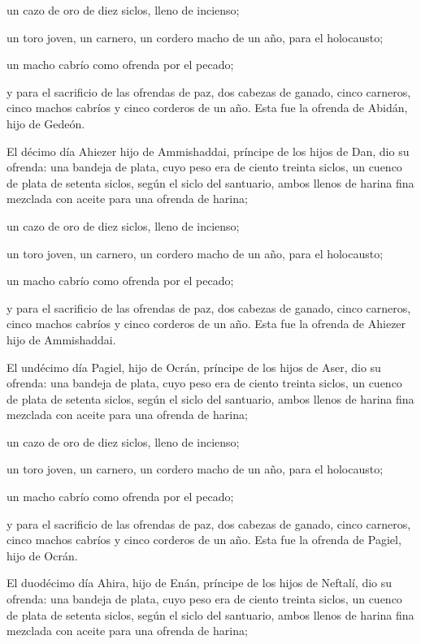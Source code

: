  un cazo de oro de diez siclos, lleno de incienso;

 un toro joven, un carnero, un cordero macho de un año,
para el holocausto;

 un macho cabrío como ofrenda por el pecado;

 y para el sacrificio de las ofrendas de paz, dos cabezas
de ganado, cinco carneros, cinco machos cabríos y cinco corderos de un
año. Esta fue la ofrenda de Abidán, hijo de Gedeón.

 El décimo día Ahiezer hijo de Ammishaddai, príncipe de
los hijos de Dan,  dio su ofrenda: una bandeja de plata,
cuyo peso era de ciento treinta siclos, un cuenco de plata de setenta
siclos, según el siclo del santuario, ambos llenos de harina fina
mezclada con aceite para una ofrenda de harina;

 un cazo de oro de diez siclos, lleno de incienso;

 un toro joven, un carnero, un cordero macho de un año,
para el holocausto;

 un macho cabrío como ofrenda por el pecado;

 y para el sacrificio de las ofrendas de paz, dos cabezas
de ganado, cinco carneros, cinco machos cabríos y cinco corderos de un
año. Esta fue la ofrenda de Ahiezer hijo de Ammishaddai.

 El undécimo día Pagiel, hijo de Ocrán, príncipe de los
hijos de Aser,  dio su ofrenda: una bandeja de plata,
cuyo peso era de ciento treinta siclos, un cuenco de plata de setenta
siclos, según el siclo del santuario, ambos llenos de harina fina
mezclada con aceite para una ofrenda de harina;

 un cazo de oro de diez siclos, lleno de incienso;

 un toro joven, un carnero, un cordero macho de un año,
para el holocausto;

 un macho cabrío como ofrenda por el pecado;

 y para el sacrificio de las ofrendas de paz, dos cabezas
de ganado, cinco carneros, cinco machos cabríos y cinco corderos de un
año. Esta fue la ofrenda de Pagiel, hijo de Ocrán.

 El duodécimo día Ahira, hijo de Enán, príncipe de los
hijos de Neftalí,  dio su ofrenda: una bandeja de plata,
cuyo peso era de ciento treinta siclos, un cuenco de plata de setenta
siclos, según el siclo del santuario, ambos llenos de harina fina
mezclada con aceite para una ofrenda de harina;

